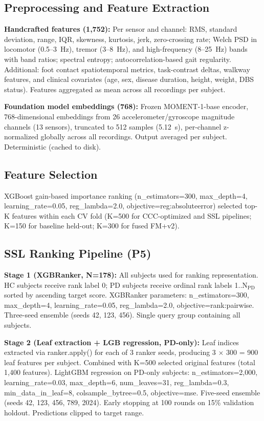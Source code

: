 \documentclass[11pt]{article}
\begin{document}
\subsection{Preprocessing and Feature Extraction}

\textbf{Handcrafted features (1,752):} Per sensor and channel: RMS, standard deviation, range, IQR, skewness, kurtosis, jerk, zero-crossing rate; Welch PSD in locomotor (0.5--3~Hz), tremor (3--8~Hz), and high-frequency (8--25~Hz) bands with band ratios; spectral entropy; autocorrelation-based gait regularity. Additional: foot contact spatiotemporal metrics, task-contrast deltas, walkway features, and clinical covariates (age, sex, disease duration, height, weight, DBS status). Features aggregated as mean across all recordings per subject.

\textbf{Foundation model embeddings (768):} Frozen MOMENT-1-base encoder\cite{moment2024}, 768-dimensional embeddings from 26 accelerometer/gyroscope magnitude channels (13 sensors), truncated to 512 samples (5.12~s), per-channel z-normalized globally across all recordings. Output averaged per subject. Deterministic (cached to disk).

\subsection{Feature Selection}

XGBoost gain-based importance ranking (n\_estimators=300, max\_depth=4, learning\_rate=0.05, reg\_lambda=2.0, objective=reg:absoluteerror) selected top-K features within each CV fold (K=500 for CCC-optimized and SSL pipelines; K=150 for baseline held-out; K=300 for fused FM+v2).

\subsection{SSL Ranking Pipeline (P5)}

\textbf{Stage 1 (XGBRanker, N=178):} All subjects used for ranking representation. HC subjects receive rank label 0; PD subjects receive ordinal rank labels 1..N$_{\text{PD}}$ sorted by ascending target score. XGBRanker parameters: n\_estimators=300, max\_depth=4, learning\_rate=0.05, reg\_lambda=2.0, objective=rank:pairwise. Three-seed ensemble (seeds 42, 123, 456). Single query group containing all subjects.

\textbf{Stage 2 (Leaf extraction + LGB regression, PD-only):} Leaf indices extracted via ranker.apply() for each of 3 ranker seeds, producing 3 $\times$ 300 = 900 leaf features per subject. Combined with K=500 selected original features (total 1,400 features). LightGBM regression on PD-only subjects: n\_estimators=2,000, learning\_rate=0.03, max\_depth=6, num\_leaves=31, reg\_lambda=0.3, min\_data\_in\_leaf=8, colsample\_bytree=0.5, objective=mse. Five-seed ensemble (seeds 42, 123, 456, 789, 2024). Early stopping at 100 rounds on 15\% validation holdout. Predictions clipped to target range.
\end{document}
